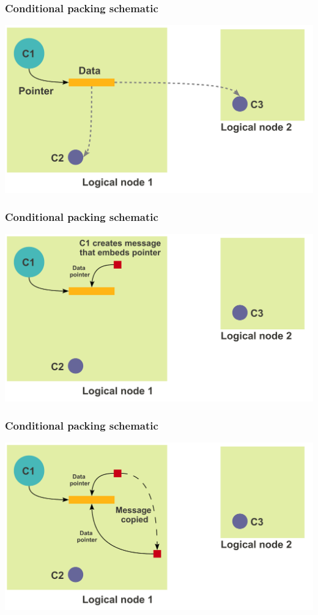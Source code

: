 \begin{frame}[fragile]
  \frametitle{Conditional packing schematic}
  \includegraphics[width=\textwidth]{figures/advancedOpts/fig1}
\end{frame}

\begin{frame}[fragile]
  \frametitle{Conditional packing schematic}
  \includegraphics[width=\textwidth]{figures/advancedOpts/fig2}
\end{frame}

\begin{frame}[fragile]
  \frametitle{Conditional packing schematic}
  \includegraphics[width=\textwidth]{figures/advancedOpts/fig2_1}
\end{frame}

